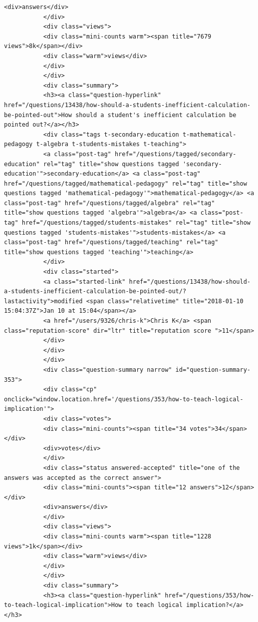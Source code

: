 \documentclass[11pt]{article}
\begin{document}
\begin{Verbatim}[commandchars=\\\{\}]
           <div>answers</div>
           </div>
           <div class="views">
           <div class="mini-counts warm"><span title="7679 views">8k</span></div>
           <div class="warm">views</div>
           </div>
           </div>
           <div class="summary">
           <h3><a class="question-hyperlink" href="/questions/13438/how-should-a-students-inefficient-calculation-be-pointed-out">How should a student's inefficient calculation be pointed out?</a></h3>
           <div class="tags t-secondary-education t-mathematical-pedagogy t-algebra t-students-mistakes t-teaching">
           <a class="post-tag" href="/questions/tagged/secondary-education" rel="tag" title="show questions tagged 'secondary-education'">secondary-education</a> <a class="post-tag" href="/questions/tagged/mathematical-pedagogy" rel="tag" title="show questions tagged 'mathematical-pedagogy'">mathematical-pedagogy</a> <a class="post-tag" href="/questions/tagged/algebra" rel="tag" title="show questions tagged 'algebra'">algebra</a> <a class="post-tag" href="/questions/tagged/students-mistakes" rel="tag" title="show questions tagged 'students-mistakes'">students-mistakes</a> <a class="post-tag" href="/questions/tagged/teaching" rel="tag" title="show questions tagged 'teaching'">teaching</a>
           </div>
           <div class="started">
           <a class="started-link" href="/questions/13438/how-should-a-students-inefficient-calculation-be-pointed-out/?lastactivity">modified <span class="relativetime" title="2018-01-10 15:04:37Z">Jan 10 at 15:04</span></a>
           <a href="/users/9326/chris-k">Chris K</a> <span class="reputation-score" dir="ltr" title="reputation score ">11</span>
           </div>
           </div>
           </div>
           <div class="question-summary narrow" id="question-summary-353">
           <div class="cp" onclick="window.location.href='/questions/353/how-to-teach-logical-implication'">
           <div class="votes">
           <div class="mini-counts"><span title="34 votes">34</span></div>
           <div>votes</div>
           </div>
           <div class="status answered-accepted" title="one of the answers was accepted as the correct answer">
           <div class="mini-counts"><span title="12 answers">12</span></div>
           <div>answers</div>
           </div>
           <div class="views">
           <div class="mini-counts warm"><span title="1228 views">1k</span></div>
           <div class="warm">views</div>
           </div>
           </div>
           <div class="summary">
           <h3><a class="question-hyperlink" href="/questions/353/how-to-teach-logical-implication">How to teach logical implication?</a></h3>

\end{Verbatim}
\end{document}

